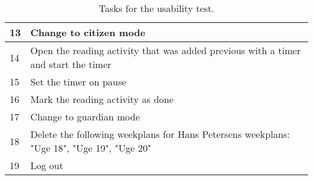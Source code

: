 \begin{table}[H]
\begin{tabular}{|p{1.3cm}|p{12cm}|}
    13 & Change to citizen mode                                                                              \\ \hline
    14 & Open the reading activity that was added previous with a timer and start the timer               \\ \hline
    15 & Set the timer on pause                                                                           \\ \hline
    16 & Mark the reading activity as done                                                                 \\ \hline
    17 & Change to guardian mode                                                                           \\ \hline
    18 & Delete the following weekplans for Hans Petersens weekplans: "Uge 18", "Uge 19", "Uge 20"      \\ \hline
    19 & Log out                                                                                                                                                                                             \\ \hline    \end{tabular}
    \caption{Tasks for the usability test.}\label{table:mette_usability_tasks}
\end{table}

\newpage

